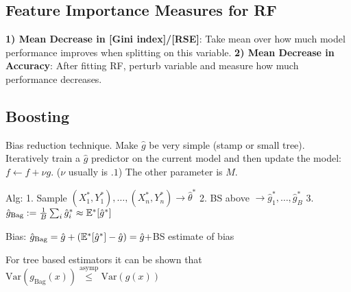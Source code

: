 \subsection*{Feature Importance Measures for RF}
\textbf{1) Mean Decrease in [Gini index]/[RSE]}: Take mean over how much model performance improves when splitting on this variable. 
\textbf{2) Mean Decrease in Accuracy}: After fitting RF, perturb variable and measure how much performance decreases.
\subsection*{Boosting}
Bias reduction technique. Make $\hat g$ be very simple (stamp or small tree). Iteratively train a $\hat g$ predictor on the current model and then update the model: $f \gets f + \nu g$. ($\nu$ usually is $.1$) The other parameter is $M$.


Alg: 1. Sample $(X^*_1,Y^*_1),\dots,(X^*_n,Y^*_n)\rightarrow \hat \theta^*$ 2. BS above $\rightarrow \hat g_1^*,\dots, \hat g_B^*$ 3. $\hat g_{\text{Bag}} := \frac{1}{B}\sum_i \hat g_i^*\approx \mathbb{E}^*[\hat g^*]$

Bias: $\hat g_{\text{Bag}}=\hat g + (\mathbb{E}^*[\hat g^*]-\hat g)=\hat g + $BS estimate of bias

For tree based estimators it can be shown that $\text{Var}(g_{\text{Bag}}(x))\stackrel{\text{asymp}}{\leq} \text{Var}(g(x))$